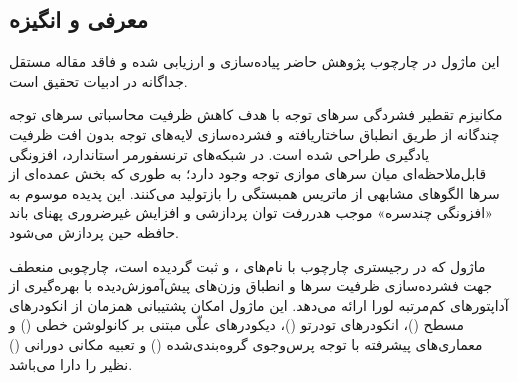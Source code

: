 \subsection{معرفی و انگیزه}
این ماژول در چارچوب پژوهش حاضر پیاده‌سازی و ارزیابی شده و فاقد مقاله مستقل جداگانه در ادبیات تحقیق است.

مکانیزم تقطیر فشردگی سرهای توجه  با هدف کاهش ظرفیت محاسباتی سرهای توجه چندگانه از طریق انطباق ساختاریافته و فشرده‌سازی لایه‌های توجه بدون افت ظرفیت یادگیری طراحی شده است. در شبکه‌های ترنسفورمر استاندارد، افزونگی قابل‌ملاحظه‌ای میان سرهای موازی توجه وجود دارد؛ به طوری که بخش عمده‌ای از سرها الگوهای مشابهی از ماتریس همبستگی را بازتولید می‌کنند. این پدیده موسوم به «افزونگی چندسره» موجب هدررفت توان پردازشی و افزایش غیرضروری پهنای باند حافظه حین پردازش می‌شود.

ماژول  که در رجیستری چارچوب با نام‌های ،  و  ثبت گردیده است، چارچوبی منعطف جهت فشرده‌سازی ظرفیت سرها و انطباق وزن‌های پیش‌آموزش‌دیده با بهره‌گیری از آداپتورهای کم‌مرتبه لورا  ارائه می‌دهد. این ماژول امکان پشتیبانی همزمان از انکودرهای مسطح ()، انکودرهای تودرتو ()، دیکودرهای علّی مبتنی بر کانولوشن خطی () و معماری‌های پیشرفته با توجه پرس‌وجوی گروه‌بندی‌شده () و تعبیه مکانی دورانی () نظیر  را دارا می‌باشد.
